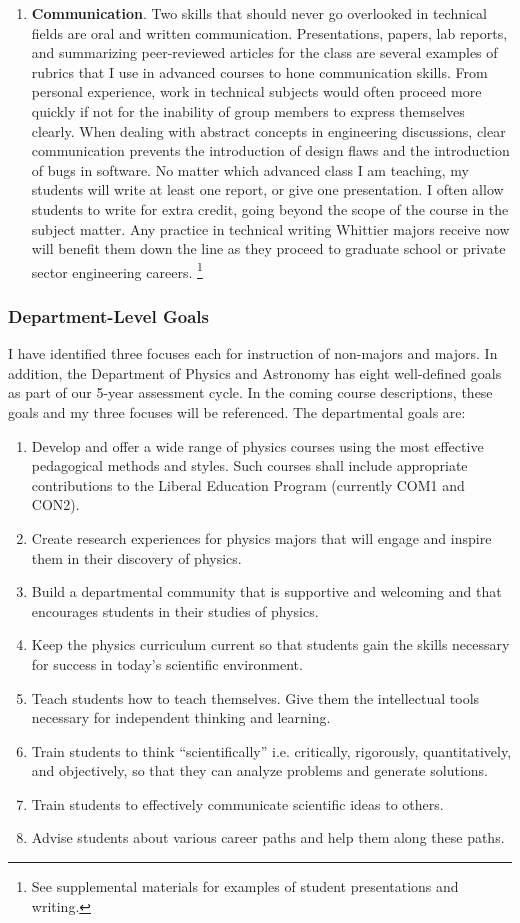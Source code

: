 \documentclass[../../main.tex]{subfiles}
\begin{document}
\begin{enumerate}
\item \textbf{Communication}.  Two skills that should never go overlooked in technical fields are oral and written communication.  Presentations, papers, lab reports, and summarizing peer-reviewed articles for the class are several examples of rubrics that I use in advanced courses to hone communication skills.  From personal experience, work in technical subjects would often proceed more quickly if not for the inability of group members to express themselves clearly.  When dealing with abstract concepts in engineering discussions, clear communication prevents the introduction of design flaws and the introduction of bugs in software. No matter which advanced class I am teaching, my students will write at least one report, or give one presentation.  I often allow students to write for extra credit, going beyond the scope of the course in the subject matter.  Any practice in technical writing Whittier majors receive now will benefit them down the line as they proceed to graduate school or private sector engineering careers. \footnote{See supplemental materials for examples of student presentations and writing.}
\end{enumerate}

\subsubsection{Department-Level Goals}

I have identified three focuses each for instruction of non-majors and majors.  In addition, the Department of Physics and Astronomy has eight well-defined goals as part of our 5-year assessment cycle. In the coming course descriptions, these goals and my three focuses will be referenced. The departmental goals are:

\begin{enumerate}
\item Develop and offer a wide range of physics courses using the most effective pedagogical methods and styles.  Such courses shall include appropriate contributions to the Liberal Education Program (currently COM1 and CON2).
\item Create research experiences for physics majors that will engage and inspire them in their discovery of physics.
\item Build a departmental community that is supportive and welcoming and that encourages students in their studies of physics.
\item Keep the physics curriculum current so that students gain the skills necessary for success in today’s scientific environment.
\item Teach students how to teach themselves. Give them the intellectual tools necessary for independent thinking and learning.
\item Train students to think ``scientifically'' i.e. critically, rigorously, quantitatively, and objectively, so that they can analyze problems and generate solutions.
\item Train students to effectively communicate scientific ideas to others.
\item Advise students about various career paths and help them along these paths.
\end{enumerate}
\end{document}
